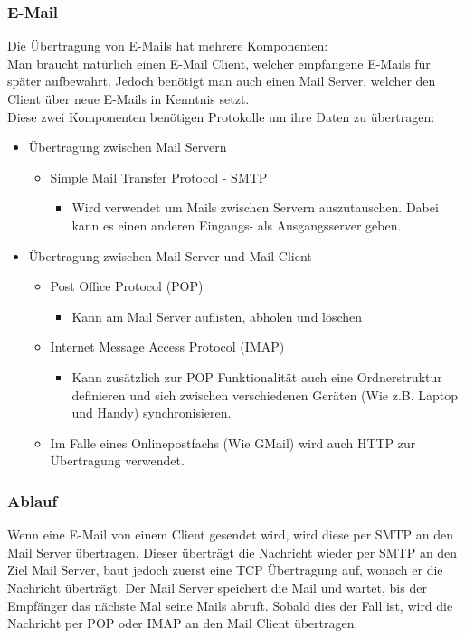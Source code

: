 \documentclass{article}
\begin{document}
	 \subsubsection{E-Mail}
	 Die Übertragung von E-Mails hat mehrere Komponenten: \\
	 Man braucht natürlich einen E-Mail Client, welcher empfangene E-Mails für später aufbewahrt. Jedoch benötigt man auch einen Mail Server, welcher den Client über neue E-Mails in Kenntnis setzt. \\
	 Diese zwei Komponenten benötigen Protokolle um ihre Daten zu übertragen:
	 \begin{itemize}
	 	\item{Übertragung zwischen Mail Servern}
		\begin{itemize}
	 		\item{Simple Mail Transfer Protocol - SMTP}
		 	\begin{itemize}
		 		\item{Wird verwendet um Mails zwischen Servern auszutauschen. Dabei kann es einen anderen Eingangs- als Ausgangsserver geben.}
		 	\end{itemize}
		\end{itemize}
		\item{Übertragung zwischen Mail Server und Mail Client}
		\begin{itemize}
			\item{Post Office Protocol (POP)}
			\begin{itemize}
				\item{Kann am Mail Server auflisten, abholen und löschen}
			\end{itemize}
			\item{Internet Message Access Protocol (IMAP)}
			\begin{itemize}
				\item{Kann zusätzlich zur POP Funktionalität auch eine Ordnerstruktur definieren und sich zwischen verschiedenen Geräten (Wie z.B. Laptop und Handy) synchronisieren.}
			\end{itemize}
			\item{Im Falle eines Onlinepostfachs (Wie GMail) wird auch HTTP zur Übertragung verwendet.}
		\end{itemize}
	 \end{itemize}
	 \subsubsection{Ablauf}
	 Wenn eine E-Mail von einem Client gesendet wird, wird diese per SMTP an den Mail Server übertragen. Dieser überträgt die Nachricht wieder per SMTP an den Ziel Mail Server, baut jedoch zuerst eine TCP Übertragung auf, wonach er die Nachricht überträgt. Der Mail Server speichert die Mail und wartet, bis der Empfänger das nächste Mal seine Mails abruft. Sobald dies der Fall ist, wird die Nachricht per POP oder IMAP an den Mail Client übertragen.
\end{document}
